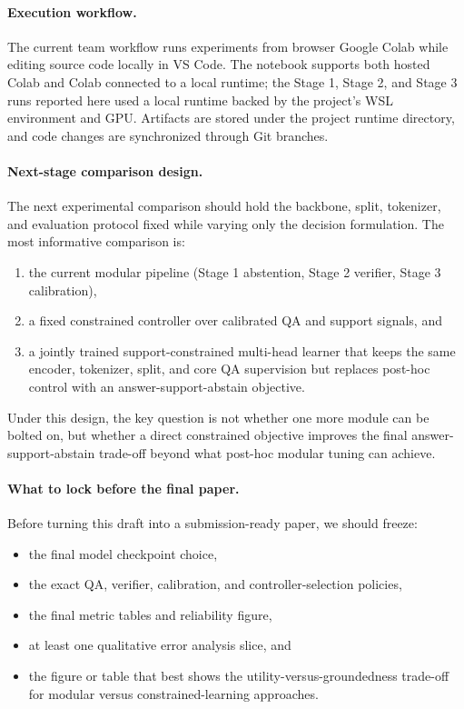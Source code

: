 \paragraph{Execution workflow.}
The current team workflow runs experiments from browser Google Colab while
editing source code locally in VS Code.
The notebook supports both hosted Colab and Colab connected to a local runtime;
the Stage 1, Stage 2, and Stage 3 runs reported here used a local runtime
backed by the project's WSL environment and GPU.
Artifacts are stored under the project runtime directory, and code changes are
synchronized through Git branches.

\paragraph{Next-stage comparison design.}
The next experimental comparison should hold the backbone, split, tokenizer,
and evaluation protocol fixed while varying only the decision formulation.
The most informative comparison is:
\begin{enumerate}[leftmargin=1.25em]
  \item the current modular pipeline
  (Stage 1 abstention, Stage 2 verifier, Stage 3 calibration),
  \item a fixed constrained controller over calibrated QA and support signals,
  and
  \item a jointly trained support-constrained multi-head learner that keeps
  the same encoder, tokenizer, split, and core QA supervision but replaces
  post-hoc control with an answer-support-abstain objective.
\end{enumerate}
Under this design, the key question is not whether one more module can be
bolted on, but whether a direct constrained objective improves the final
answer-support-abstain trade-off beyond what post-hoc modular tuning can
achieve.

\paragraph{What to lock before the final paper.}
Before turning this draft into a submission-ready paper, we should freeze:
\begin{itemize}[leftmargin=1.25em]
  \item the final model checkpoint choice,
  \item the exact QA, verifier, calibration, and controller-selection policies,
  \item the final metric tables and reliability figure,
  \item at least one qualitative error analysis slice, and
  \item the figure or table that best shows the utility-versus-groundedness
  trade-off for modular versus constrained-learning approaches.
\end{itemize}
